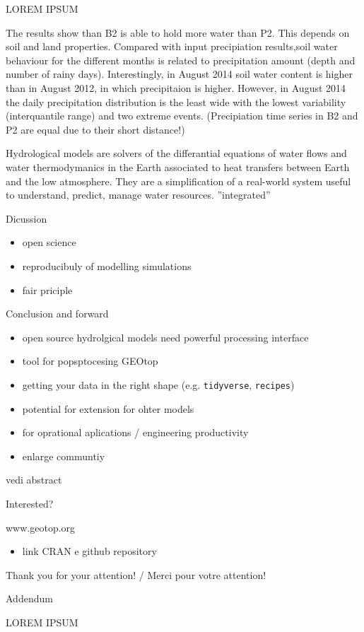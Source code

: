 \documentclass[ignorenonframetext,]{beamer}
\providecommand{\tightlist}{%
  \setlength{\itemsep}{0pt}\setlength{\parskip}{0pt}}
\begin{document}
\begin{frame}{LOREM IPSUM}

The results show than B2 is able to hold more water than P2. This
depends on soil and land properties. Compared with input precipiation
results,soil water behaviour for the different months is related to
precipitation amount (depth and number of rainy days). Interestingly, in
August 2014 soil water content is higher than in August 2012, in which
precipitaion is higher. However, in August 2014 the daily precipitation
distribution is the least wide with the lowest variability
(interquantile range) and two extreme events. (Precipiation time series
in B2 and P2 are equal due to their short distance!)

Hydrological models are solvers of the differantial equations of water
flows and water thermodymanics in the Earth associated to heat transfers
between Earth and the low atmosphere. They are a simplification of a
real-world system useful to understand, predict, manage water resources.
''integrated''

\end{frame}

\begin{frame}{Dicussion}

\begin{itemize}
\tightlist
\item
  open science
\item
  reproducibuly of modelling simulations
\item
  fair priciple
\end{itemize}

\end{frame}

\begin{frame}[fragile]{Conclusion and forward}

\begin{itemize}
\item
  open source hydrolgical models need powerful processing interface
\item
  tool for popsptocesing GEOtop
\item
  getting your data in the right shape (e.g. \texttt{tidyverse},
  \texttt{recipes})
\item
  potential for extension for ohter models
\item
  for oprational aplications / engineering productivity
\item
  enlarge communtiy
\end{itemize}

vedi abstract

\end{frame}

\begin{frame}{Interested?}

www.geotop.org

\begin{itemize}
\tightlist
\item
  link CRAN e github repository
\end{itemize}

Thank you for your attention! / Merci pour votre attention!

\end{frame}

\begin{frame}{Addendum}

LOREM IPSUM

\end{frame}
\end{document}
